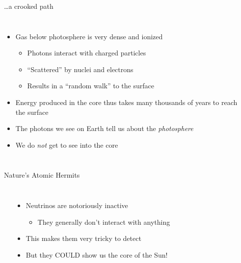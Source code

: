 \documentclass[pdf, aspectratio=169]{beamer}
\begin{document}
\begin{frame}{\ldots a crooked path}
  \begin{columns}
	\begin{itemize}
	  \item Gas below photosphere is very dense and ionized
		\begin{itemize}
		  \item Photons interact with charged particles
		  \item ``Scattered'' by nuclei and electrons
		  \item Results in a ``random walk'' to the surface
		\end{itemize}
	  \item Energy produced in the core thus takes many thousands of years to reach the surface
	  \item The photons we see on Earth tell us about the \emph{photosphere}
	  \item We do \emph{not} get to see into the core
	\end{itemize}
	\begin{center}
	\end{center}
  \end{columns}
\end{frame}

\begin{frame}{Nature's Atomic Hermits}
  \begin{columns}
	\begin{center}
	  \vspace{-8mm}
	\end{center}
	\begin{itemize}
	  \item Neutrinos are notoriously inactive
		\begin{itemize}
		  \item They generally don't interact with anything
		\end{itemize}
	  \item This makes them very tricky to detect
	  \item But they COULD show us the core of the Sun!
	\end{itemize}
  \end{columns}
\end{frame}
\end{document}
